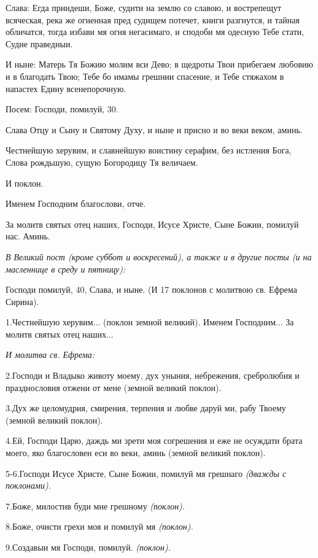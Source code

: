 Слава: Егда приидеши, Боже, судити на землю со славою, и вострепещут всяческая, река же огненная пред судищем потечет, книги разгнутся, и тайная обличатся, тогда избави мя огня негасимаго, и сподоби мя одесную Тебе стати, Судие праведныи.


И ныне: Матерь Тя Божию молим вси Дево; в щедроты Твои прибегаем любовию и в благодать Твою; Тебе бо имамы грешнии спасение, и Тебе стяжахом в напастех Едину всенепорочную.


Посем: Господи, помилуй, 30.


Слава Отцу и Сыну и Святому Духу, и ныне и присно и во веки веком, аминь.


Честнейшую херувим, и славнейшую воистину серафим, без истления Бога, Слова рождьшую, сущую Богородицу Тя величаем.


И поклон.


Именем Господним благослови, отче.


За молитв святых отец наших, Господи, Исусе Христе, Сыне Божии, помилуй нас. Аминь.


\itshape В Великий пост (кроме суббот и воскресений), а также и в другие посты (и на масленнице в среду и пятницу):\normalfont{}


Господи помилуй, 40, Слава, и ныне. (И 17 поклонов с молитвою св. Ефрема Сирина).



1.Честнейшую херувим... (поклон земной великий). Именем Господним... За молитв святых отец наших...


\itshape И молитва св. Ефрема:\normalfont{}


2.Господи и Владыко животу моему, дух уныния, небрежения, сребролюбия и празднословия отжени от мене (земной великий поклон).


3.Дух же целомудрия, смирения, терпения и любве даруй ми, рабу Твоему (земной великий поклон).


4.Ей, Господи Царю, даждь ми зрети моя согрешения и еже не осуждати брата моего, яко благословен еси во веки, аминь (земной великий поклон).


5-6.Господи Исусе Христе, Сыне Божии, помилуй мя грешнаго \itshape (дважды с поклонами)\normalfont{}.


7.Боже, милостив буди мне грешному \itshape (поклон)\normalfont{}.


8.Боже, очисти грехи моя и помилуй мя \itshape (поклон)\normalfont{}.


9.Создавыи мя Господи, помилуй. \itshape (поклон)\normalfont{}.


